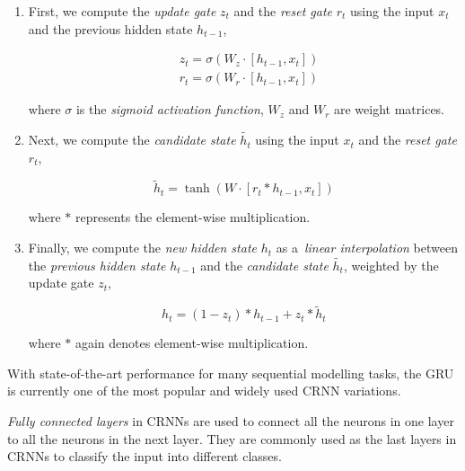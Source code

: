 \begin{enumerate}
    \item First, we compute the \textit{update gate} \textbf{$z_t$} and the \textit{reset gate} \textbf{$r_t$} using the input \textbf{$x_t$} and the previous hidden state \textbf{$h_{t-1}$},
    
    \begin{equation}
    \begin{aligned}
    & z_t=\sigma\left(W_z \cdot\left[h_{t-1}, x_t\right]\right) \\
    & r_t=\sigma\left(W_r \cdot\left[h_{t-1}, x_t\right]\right)
    \end{aligned}
    \end{equation}

    where \textbf{$\sigma$} is the \textit{sigmoid activation function}, \textbf{$W_z$} and \textbf{$W_r$} are weight matrices.

    \item Next, we compute the \textit{candidate state} \textbf{$\tilde{h_t}$} using the input \textbf{$x_t$} and the \textit{reset gate} \textbf{$r_t$},

    \begin{equation}
    \tilde{h}_t=\tanh \left(W \cdot\left[r_t * h_{t-1}, x_t\right]\right)
    \end{equation}
    
    
    where \textbf{$*$} represents the element-wise multiplication.

    \item Finally, we compute the \textit{new hidden state} \textbf{$h_t$} as a~\textit{linear interpolation} between the \textit{previous hidden state} \textbf{$h_{t-1}$} and the \textit{candidate state} \textbf{$\tilde{h_t}$}, weighted by the update gate \textbf{$z_t$},
    
    \begin{equation}
    h_t=\left(1-z_t\right) * h_{t-1}+z_t * \tilde{h}_t
    \end{equation}

    where \textbf{$*$} again denotes element-wise multiplication.
    
\end{enumerate}
With state-of-the-art performance for many sequential modelling tasks, the GRU is currently one of the most popular and widely used CRNN variations.


\textit{Fully connected layers} in CRNNs are used to connect all the neurons in one layer to all the neurons in the next layer. They are commonly used as the last layers in CRNNs to classify the input into different classes.
 

